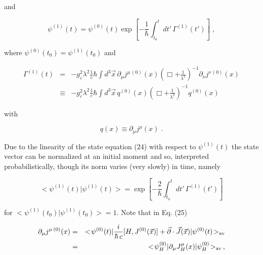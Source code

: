 \documentclass[a4paper,12pt]{article}
\begin{document}
\ni and

\vspace{-0.2cm}

\begin{equation}
\psi^{(1)}(t) = \psi^{(0)}(t) \exp\left[ -\frac{1}{\hbar} \int^t_{t_0} dt'\, \Gamma^{(1)}(t')\right] \;,
\end{equation}

\ni where $\psi^{(0)}(t_0) = \psi^{(1)}(t_0)$ and 

\vspace{-0.2cm}

\begin{eqnarray}
\Gamma^{(1)}(t) & = & -g^2_\varepsilon \lambda^2 \frac{1}{c} \hbar \int d^3\vec{x}\,\partial_\mu j^{\mu\,(0)}(x) \left( \Box + \frac{1}{\lambda^2}\right)^{-1} \partial_\nu j^{\nu\,(0)}(x) \nonumber \\
& \equiv & -g^2_\varepsilon \lambda^2 \frac{1}{c} \hbar \int d^3\vec{x}\,q^{(0)}(x) \left( \Box + \frac{1}{\lambda^2}\right)^{-1} q^{(0)}(x)
\end{eqnarray} 

\vspace{-0.1cm}

\ni with

\vspace{-0.2cm}

\begin{equation}
q(x) \equiv \partial_\mu j^{\mu}(x)\;.
\end{equation}

\ni Due to the linearity of the state equation (24) with respect to $\psi^{(1)}(t)$ the state vector can be normalized at an initial moment and so, interpreted probabilistically, though its norm varies (very slowly) in time, namely

\begin{equation}
<\!\psi^{(1)}(t) | \psi^{(1)}(t)\!> = \exp \left[-\frac{2}{\hbar} \int^t_{t_0} dt'\, \Gamma^{(1)}(t') \right]
\end{equation}

\ni for $<\!\psi^{(1)}(t_0)|\psi^{(1)}(t_0)\!> = 1$. Note that in Eq. (25)

\vspace{-0.2cm}

\begin{eqnarray}
\partial_\mu j^{\mu\,(0)}(x)  & = & <\!\psi^{(0)}(t)| \frac{i}{\hbar\,c}[H, J^{(0)}(\vec{x})] + \vec{\partial}\cdot \vec{J}(\vec{x})| \psi^{(0)}(t)\!>_{\rm av}  \nonumber \\ & = & <\!\psi^{(0)}_H|\partial_\mu J^\mu_H(x)| \psi^{(0)}_H\!>_{\rm av}  \,,
\end{eqnarray} 
\end{document}
